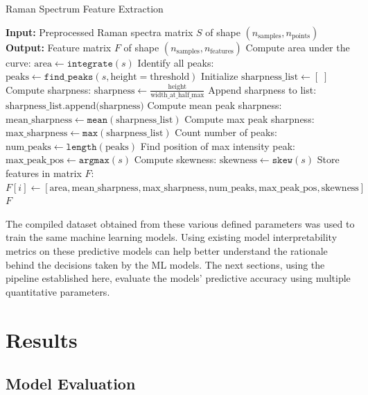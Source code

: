 \begin{algorithm}
\caption{Raman Spectrum Feature Extraction}
\begin{algorithmic}[1]
\State \textbf{Input:} Preprocessed Raman spectra matrix $S$ of shape $(n_{\text{samples}}, n_{\text{points}})$
\State \textbf{Output:} Feature matrix $F$ of shape $(n_{\text{samples}}, n_{\text{features}})$
    \State Compute area under the curve: $ \text{area} \gets \texttt{integrate}(s)$
    \State Identify all peaks: $ \text{peaks} \gets \texttt{find\_peaks}(s, \text{height} = \text{threshold})$
    \State Initialize $ \text{sharpness\_list} \gets [\;]$
        \State Compute sharpness: $ \text{sharpness} \gets \frac{\text{height}}{\text{width\_at\_half\_max}}$
        \State Append sharpness to list: $ \text{sharpness\_list.append(sharpness)}$
    \EndFor
    \State Compute mean peak sharpness: $ \text{mean\_sharpness} \gets \texttt{mean}( \text{sharpness\_list})$
    \State Compute max peak sharpness: $ \text{max\_sharpness} \gets \texttt{max}( \text{sharpness\_list})$
    \State Count number of peaks: $ \text{num\_peaks} \gets \texttt{length}(\text{peaks})$
    \State Find position of max intensity peak: $ \text{max\_peak\_pos} \gets \texttt{argmax}(s)$
    \State Compute skewness: $ \text{skewness} \gets \texttt{skew}(s)$
    \State Store features in matrix $F$: $F[i] \gets [\text{area}, \text{mean\_sharpness}, \text{max\_sharpness}, \text{num\_peaks}, \text{max\_peak\_pos}, \text{skewness}]$
\EndFor
\State \Return $F$
\end{algorithmic}
\label{alg:feature_extraction}
\end{algorithm}

\noindent The compiled dataset obtained from these various defined parameters was used to train the same machine learning models. Using existing model interpretability metrics on these predictive models can help better understand the rationale behind the decisions taken by the ML models. The next sections, using the pipeline established here, evaluate the models’ predictive accuracy using multiple quantitative parameters.

\section{Results}
\subsection{Model Evaluation}

